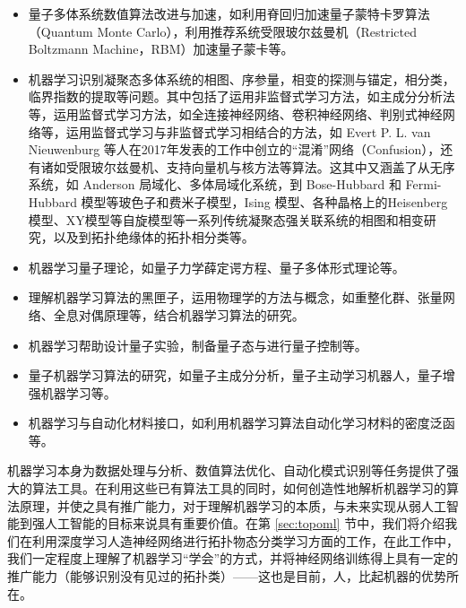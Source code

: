 \begin{itemize}

\item 量子多体系统数值算法改进与加速，如利用脊回归加速量子蒙特卡罗算法（Quantum Monte Carlo）\cite{acmc1,acmc2,acmc3,acmc4}，利用推荐系统受限玻尔兹曼机（Restricted Boltzmann Machine，RBM）加速量子蒙卡\cite{acmcwl1,acmcwl2}等。

\item 机器学习识别凝聚态多体系统的相图、序参量，相变的探测与锚定，相分类，临界指数的提取等问题\cite{ml-anderson-2014,confusion,mlphase2017-nphys,wangleipca2016,wcpca,mlphase2017-prx,jp1,jp2,jp3,jp4,zhangyiml2017,zpf2017,wanxin-2017,kernel2017,ml-mbl-2017,pca2017a,pca2017b,rbm-2017,unsup-2017,unsup-hubb-2018,discriminative2018,ml-disorder-2018}。其中包括了运用非监督式学习方法\cite{unsup-2017,unsup-hubb-2018}，如主成分分析法\cite{wangleipca2016,wcpca,pca2017a,pca2017b}等，运用监督式学习方法，如全连接神经网络\cite{zhangyiml2017,mlphase2017-prx,ml-mbl-2017}、卷积神经网络\cite{zpf2017,jp1,jp2,jp3,jp4,mlphase2017-nphys,wanxin-2017}、判别式神经网络\cite{discriminative2018}等，运用监督式学习与非监督式学习相结合的方法，如 Evert P. L. van Nieuwenburg 等人在2017年发表的工作\cite{confusion}中创立的“混淆”网络（Confusion），还有诸如受限玻尔兹曼机\cite{rbm-2017}、支持向量机与核方法\cite{kernel2017}等算法。这其中又涵盖了从无序系统\cite{ml-disorder-2018}，如 Anderson 局域化\cite{ml-anderson-2014,jp1,jp2,jp4}、多体局域化\cite{ml-mbl-2017}系统，到 Bose-Hubbard 和 Fermi-Hubbard 模型等玻色子和费米子模型\cite{confusion,rbm-2017,mlphase2017-prx,pca2017b,unsup-hubb-2018}，Ising 模型\cite{jp3,kernel2017,mlphase2017-nphys,wangleipca2016,wcpca,wanxin-2017}、各种晶格上的Heisenberg 模型、XY模型\cite{pca2017a,unsup-2017,wcpca}等自旋模型等一系列传统凝聚态强关联系统的相图和相变研究，以及到拓扑绝缘体的拓扑相分类\cite{zhangyiml2017,zpf2017,jp1,jp2}等。

\item 机器学习量子理论，如量子力学薛定谔方程\cite{dlshrodinger2017,wyd2018}、量子多体形式理论\cite{ml-manybody}等。

\item 理解机器学习算法的黑匣子\cite{mlanalysis2017lin}，运用物理学的方法与概念，如重整化群\cite{dlrg2013,maprgdl2014,rgml2018}、张量网络、全息对偶原理\cite{yyz2018}等，结合机器学习算法的研究。

\item 机器学习帮助设计量子实验\cite{activelearn-exprdesign-2018}，制备量子态与进行量子控制\cite{rein-2018-prx}等。

\item 量子机器学习算法的研究\cite{qml2017,qai2017}，如量子主成分分析\cite{qpca2014}，量子主动学习机器人\cite{active-agent-2014}，量子增强机器学习\cite{qeml}等。

\item 机器学习与自动化材料接口，如利用机器学习算法自动化学习材料的密度泛函\cite{wcyyz}等。

\end{itemize}


机器学习本身为数据处理与分析、数值算法优化、自动化模式识别等任务提供了强大的算法工具。在利用这些已有算法工具的同时，如何创造性地解析机器学习的算法原理，并使之具有推广能力，对于理解机器学习的本质，与未来实现从弱人工智能到强人工智能的目标来说具有重要价值。在第 \ref{sec:topoml} 节中，我们将介绍我们在利用深度学习人造神经网络进行拓扑物态分类学习方面的工作，在此工作中，我们一定程度上理解了机器学习“学会”的方式，并将神经网络训练得上具有一定的推广能力（能够识别没有见过的拓扑类）——这也是目前，人，比起机器的优势所在。


